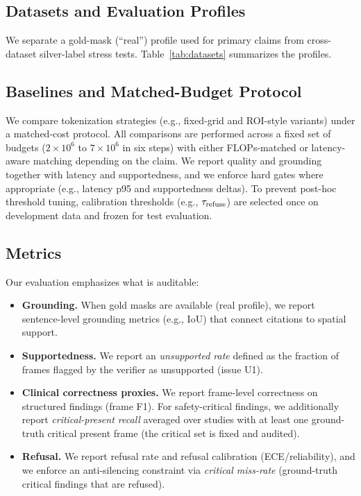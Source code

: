 \label{sec:exp}

\subsection{Datasets and Evaluation Profiles}
We separate a gold-mask (``real'') profile used for primary claims from cross-dataset silver-label stress tests.
Table~\ref{tab:datasets} summarizes the profiles.



\subsection{Baselines and Matched-Budget Protocol}
We compare tokenization strategies (e.g., fixed-grid and ROI-style variants) under a matched-cost protocol.
All comparisons are performed across a fixed set of budgets ($2\times 10^6$ to $7\times 10^6$ in six steps) with either FLOPs-matched or latency-aware matching depending on the claim.
We report quality and grounding together with latency and supportedness, and we enforce hard gates where appropriate (e.g., latency p95 and supportedness deltas).
To prevent post-hoc threshold tuning, calibration thresholds (e.g., $\tau_{\mathrm{refuse}}$) are selected once on development data and frozen for test evaluation.

\subsection{Metrics}
Our evaluation emphasizes what is auditable:
\begin{itemize}
  \item \textbf{Grounding.} When gold masks are available (real profile), we report sentence-level grounding metrics (e.g., IoU) that connect citations to spatial support.
  \item \textbf{Supportedness.} We report an \emph{unsupported rate} defined as the fraction of frames flagged by the verifier as unsupported (issue U1).
  \item \textbf{Clinical correctness proxies.} We report frame-level correctness on structured findings (frame F1). For safety-critical findings, we additionally report \emph{critical-present recall} averaged over studies with at least one ground-truth critical present frame (the critical set is fixed and audited).
  \item \textbf{Refusal.} We report refusal rate and refusal calibration (ECE/reliability), and we enforce an anti-silencing constraint via \emph{critical miss-rate} (ground-truth critical findings that are refused).
\end{itemize}

